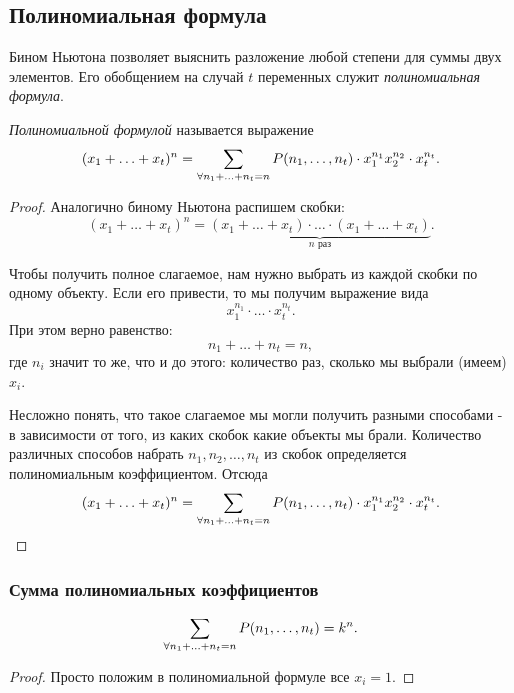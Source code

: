 \subsection{Полиномиальная формула}

\begin{definition}
	Бином Ньютона позволяет выяснить разложение любой степени для суммы двух элементов. Его обобщением на случай $t$ переменных служит \textit{полиномиальная формула}.
\end{definition}

\begin{theorem}
	\textit{Полиномиальной формулой} называется выражение
	\[
		(x_1 + \ldots + x_t)^n = \sum\limits_{\forall n_1 + \ldots + n_t = n} P(n_1, \ldots, n_t) \cdot x_1^{n_1} x_2^{n_2} \cdot x_t^{n_t}.
	\]
\end{theorem}

\begin{proof}
	Аналогично биному Ньютона распишем скобки:
	\[
		(x_1 + \ldots + x_t)^n = \underbrace{(x_1 + \ldots + x_t) \cdot \ldots \cdot (x_1 + \ldots + x_t)}_{n \text{ раз}}.
	\]
	
	Чтобы получить полное слагаемое, нам нужно выбрать из каждой скобки по одному объекту. Если его привести, то мы получим выражение вида
	\[
		x_1^{n_1} \cdot \ldots \cdot x_t^{n_t}.
	\]
	При этом верно равенство:
	\[
		n_1 + \ldots + n_t = n,
	\]
	где $n_i$ значит то же, что и до этого: количество раз, сколько мы выбрали (имеем) $x_i$.
	
	Несложно понять, что такое слагаемое мы могли получить разными способами - в зависимости от того, из каких скобок какие объекты мы брали. Количество различных способов набрать $n_1, n_2, \ldots, n_t$ из скобок определяется полиномиальным коэффициентом. Отсюда 
	\[
		(x_1 + \ldots + x_t)^n = \sum\limits_{\forall n_1 + \ldots + n_t = n} P(n_1, \ldots, n_t) \cdot x_1^{n_1} x_2^{n_2} \cdot x_t^{n_t}.
	\]
\end{proof}

\subsubsection*{Сумма полиномиальных коэффициентов}

\begin{proposition}
	\[
		\sum\limits_{\forall n_1 + \ldots + n_t = n} P(n_1, \ldots, n_t) = k^n.
	\]
\end{proposition}

\begin{proof}
	Просто положим в полиномиальной формуле все $x_i = 1$.
\end{proof}

